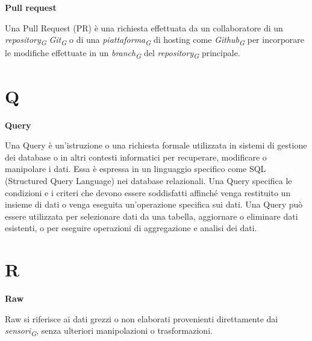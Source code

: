 \documentclass{article}
\begin{document}
\textbf{Pull request}

\vspace{0.1cm}

Una Pull Request (PR) è una richiesta effettuata da un collaboratore di un \textit{repository}\textsubscript{\textit{G}} \textit{Git}\textsubscript{\textit{G}} o di una \textit{piattaforma}\textsubscript{\textit{G}} di hosting come \textit{Github}\textsubscript{\textit{G}} per incorporare le modifiche effettuate in un \textit{branch}\textsubscript{\textit{G}} del \textit{repository}\textsubscript{\textit{G}} principale.

\pagebreak
\section*{Q}
{}

\vspace{0.4cm}

\textbf{Query}

\vspace{0.1cm}

Una Query è un'istruzione o una richiesta formale utilizzata in sistemi di gestione dei database o in altri contesti informatici per recuperare, modificare o manipolare i dati. Essa è espressa in un linguaggio specifico come SQL (Structured Query Language) nei database relazionali. Una Query specifica le condizioni e i criteri che devono essere soddisfatti affinché venga restituito un insieme di dati o venga eseguita un'operazione specifica sui dati. Una Query può essere utilizzata per selezionare dati da una tabella, aggiornare o eliminare dati esistenti, o per eseguire operazioni di aggregazione e analisi dei dati.

\pagebreak
\section*{R}
{}

\vspace{0.4cm}

\textbf{Raw}

\vspace{0.1cm}

Raw si riferisce ai dati grezzi o non elaborati provenienti direttamente dai \textit{sensori}\textsubscript{\textit{G}}, senza ulteriori manipolazioni o trasformazioni.

\vspace{0.4cm}
\end{document}
